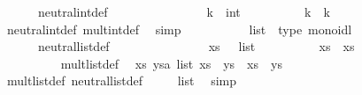 \begin{isabellebody}
\ \ \ \ \ \ neutral{\isacharunderscore}int{\isacharunderscore}def{\isacharcolon}\ {\isachardoublequoteopen}{\isasymone}\ {\isasymequiv}\ {}{\isachardoublequoteclose}\isanewline
%
\isadelimproof
\ \ \ \ %
\endisadelimproof
%
\isatagproof
{}\isamarkupfalse%
\isanewline
\ \ \ \ \ \ \isamarkupfalse%
\ k\ {\isacharcolon}{\isacharcolon}\ int\isanewline
\ \ \ \ \ \ \isamarkupfalse%
\ {\isachardoublequoteopen}{\isasymone}\ {\isasymotimes}\ k\ {\isacharequal}\ k{\isachardoublequoteclose}\ \isamarkupfalse%
\ neutral{\isacharunderscore}int{\isacharunderscore}def\ mult{\isacharunderscore}int{\isacharunderscore}def\ \isamarkupfalse%
\ simp\isanewline
\ \ \ \ \isamarkupfalse%
%
\endisatagproof
{\isafoldproof}%
%
\isadelimproof
\isanewline
%
\endisadelimproof
\isanewline
\ \ \ \ \isamarkupfalse%
\ list\ {\isacharcolon}{\isacharcolon}\ {\isacharparenleft}type{\isacharparenright}\ monoidl\isanewline
\ \ \ \ \ \ neutral{\isacharunderscore}list{\isacharunderscore}def{\isacharcolon}\ {\isachardoublequoteopen}{\isasymone}\ {\isasymequiv}\ {\isacharbrackleft}{\isacharbrackright}{\isachardoublequoteclose}\isanewline
%
\isadelimproof
\ \ \ \ %
\endisadelimproof
%
\isatagproof
{}\isamarkupfalse%
\isanewline
\ \ \ \ \ \ \isamarkupfalse%
\ xs\ {\isacharcolon}{\isacharcolon}\ {\isachardoublequoteopen}{\isasymalpha}\ list{\isachardoublequoteclose}\isanewline
\ \ \ \ \ \ \isamarkupfalse%
\ {\isachardoublequoteopen}{\isasymone}\ {\isasymotimes}\ xs\ {\isacharequal}\ xs{\isachardoublequoteclose}\isanewline
\ \ \ \ \ \ \isamarkupfalse%
\ {\isacharminus}\isanewline
\ \ \ \ \ \ \ \ \isamarkupfalse%
\ mult{\isacharunderscore}list{\isacharunderscore}def\ \isamarkupfalse%
\ {\isachardoublequoteopen}{\isasymAnd}xs\ ys{\isasymColon}{\isacharprime}a\ list{\isachardot}\ xs\ {\isasymotimes}\ ys\ {\isasymequiv}\ xs\ {\isacharat}\ ys{\isachardoublequoteclose}\ \isacommand{{\isachardot}}\isamarkupfalse%
\isanewline
\ \ \ \ \ \ \ \ \isamarkupfalse%
\ \isamarkupfalse%
\ mult{\isacharunderscore}list{\isacharunderscore}def\ neutral{\isacharunderscore}list{\isacharunderscore}def\ \isamarkupfalse%
\ {\isachardoublequoteopen}{\isasymone}\ {\isasymequiv}\ {\isacharbrackleft}{\isacharbrackright}{\isasymColon}{\isasymalpha}\ list{\isachardoublequoteclose}\ \isamarkupfalse%
\ simp\isanewline
\ \ \ \ \ \ \ \ \isamarkupfalse%

\end{isabellebody}
